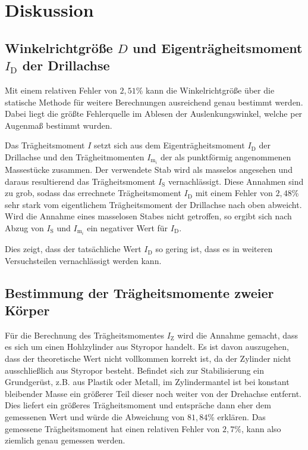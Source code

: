 \section{Diskussion} %
\label{sec:diskussion}

\subsection{Winkelrichtgröße $D$ und Eigenträgheitsmoment $I_\text{D}$ der Drillachse}

Mit einem relativen Fehler von ${2,51}$\% kann die Winkelrichtgröße über die statische Methode für weitere Berechnungen ausreichend genau bestimmt werden. 
Dabei liegt die größte Fehlerquelle im Ablesen der Auslenkungswinkel, welche per Augenmaß bestimmt wurden.


Das Trägheitsmoment ${I}$ setzt sich aus dem Eigenträgheitsmoment ${I_{\text{D}}}$ der Drillachse und den Trägheitmomenten $I_{\text{m}_i}$ der als punktförmig angenommenen Massestücke zusammen. 
Der verwendete Stab wird als masselos angesehen und daraus resultierend das Trägheitsmoment $I{_\text{S}}$ vernachlässigt. 
Diese Annahmen sind zu grob, sodass das errechnete Trägheitsmoment $I_\text{D}$ mit einem Fehler von $2,48$\% sehr stark vom eigentlichem Trägheitsmoment der Drillachse nach oben abweicht. 
Wird die Annahme eines masselosen Stabes nicht getroffen, so ergibt sich nach Abzug von $I_{\text{S}}$ und $I{_{\text{m}_i}}$ ein negativer Wert für $I_{\text{D}}$. 

Dies zeigt, dass der tatsächliche Wert $I_{\text{D}}$ so gering ist, dass es in weiteren Versuchsteilen vernachlässigt werden kann.

\subsection{Bestimmung der Trägheitsmomente zweier Körper}

Für die Berechnung des Trägheitsmomentes $I_{\text{Z}}$ wird die Annahme gemacht, dass es sich um einen Hohlzylinder aus Styropor handelt. 
Es ist davon auszugehen, dass der theoretische Wert nicht vollkommen korrekt ist, da der Zylinder nicht ausschließlich aus Styropor besteht. Befindet sich zur Stabilisierung ein Grundgerüst, z.B. aus Plastik oder Metall, im Zylindermantel ist bei konstant bleibender Masse ein größerer Teil dieser noch weiter von der Drehachse entfernt. Dies liefert ein größeres Trägheitsmoment und entspräche dann eher dem gemessenen Wert und würde die Abweichung von $81,84$\% erklären.
Das gemessene Trägheitsmoment hat einen relativen Fehler von $2,7\%$, kann also ziemlich genau gemessen werden.

